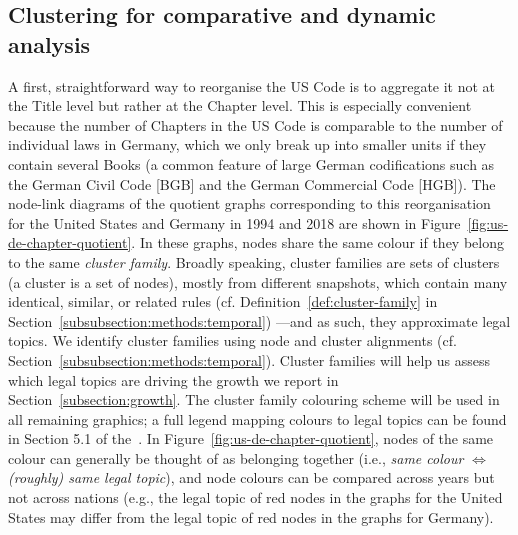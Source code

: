 \subsection{Clustering for comparative and dynamic analysis}
\label{subsection:reorganisation}

A first, straightforward way to reorganise the US Code is to aggregate it not at the Title level but rather at the Chapter level. 
This is especially convenient because the number of Chapters in the US Code is comparable to the number of individual laws in Germany,
which we only break up into smaller units if they contain several Books (a common feature of large German codifications such as the German Civil Code [BGB] and the German Commercial Code [HGB]).
The node-link diagrams of the quotient graphs corresponding to this reorganisation for the United States and Germany in 1994 and 2018 are shown in Figure~\ref{fig:us-de-chapter-quotient}.
In these graphs, nodes share the same colour if they belong to the same \emph{cluster family}.
Broadly speaking, cluster families are sets of clusters (a cluster is a set of nodes), 
mostly from different snapshots, 
which contain many identical, similar, or related rules (cf. Definition~\ref{def:cluster-family} in Section~\ref{subsubsection:methods:temporal})%
---and as such, they approximate legal topics. 
We identify cluster families using node and cluster alignments (cf. Section~\ref{subsubsection:methods:temporal}). 
Cluster families will help us assess which legal topics are driving the growth we report in Section~\ref{subsection:growth}. 
The cluster family colouring scheme will be used in all remaining graphics; 
a full legend mapping colours to legal topics can be found in Section 5.1 of the~\suppi. 
In Figure~\ref{fig:us-de-chapter-quotient}, 
nodes of the same colour can generally be thought of as belonging together (i.e., \emph{same colour} $\Leftrightarrow$ \emph{(roughly) same legal topic}), 
and node colours can be compared across years but not across nations (e.g., the legal topic of red nodes in the graphs for the United States may differ from the legal topic of red nodes in the graphs for Germany). 

